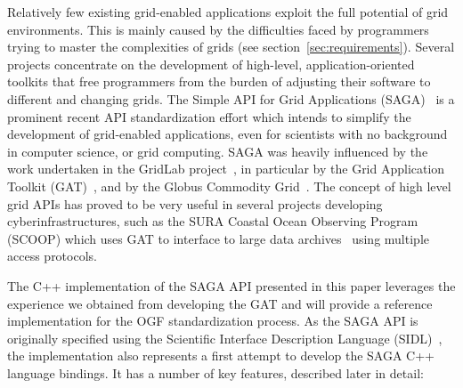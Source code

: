 
  Relatively few existing grid-enabled applications exploit the full
  potential of grid environments. This is mainly caused by the
  difficulties faced by programmers trying to master the complexities
  of grids (see section~\ref{sec:requirements}).  Several projects
  concentrate on the development of high-level, application-oriented
  toolkits that free programmers from the burden of adjusting their
  software to different and changing grids. The Simple API for Grid
  Applications (SAGA)~\cite{saga_spec} is a prominent recent API
  standardization effort which intends to simplify the development of
  grid-enabled applications, even for scientists with no background in
  computer science, or grid computing.  SAGA was heavily influenced by
  the work undertaken in the GridLab project~\cite{gridlab_webpage},
  in particular by the Grid Application Toolkit (GAT)~\cite{gat}, and
  by the Globus Commodity Grid~\cite{cog}.  The concept of high level
  grid APIs has proved to be very useful in several projects
  developing cyberinfrastructures, such as the SURA Coastal Ocean
  Observing Program (SCOOP) which uses GAT to interface to large data
  archives~\cite{CS_Huang06a} using multiple access protocols.
  
  The C++ implementation of the SAGA API presented in this paper
  leverages the experience we obtained from developing the GAT and will
  provide a reference implementation for the OGF standardization
  process.  As the SAGA API is originally specified using the
  Scientific Interface Description Language (SIDL)~\cite{sidl}, the
  implementation also represents a first attempt to develop the SAGA
  C++ language bindings.  It has a number of key features, described
  later in detail:


